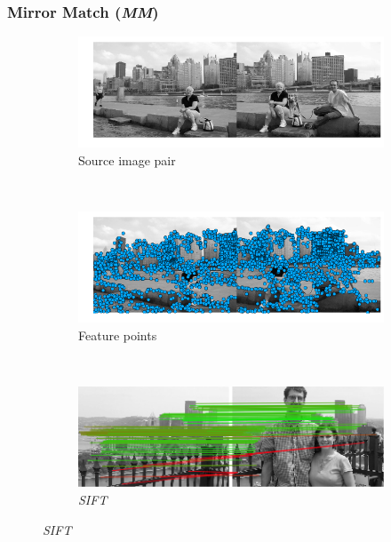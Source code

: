 \documentclass{article}
\begin{document}
\subsubsection{Mirror Match (\emph{MM})}

\begin{figure}
	\centering%
		\begin{subfigure}[t]{\columnwidth}
			\centering
			\includegraphics[width=0.85\columnwidth]{images/MMC_pitts_source}
			\caption{Source image pair}
			\label{fig:pitts_source}
		\end{subfigure}%
		\\ %
		\begin{subfigure}[t]{\columnwidth}
			\centering
			\includegraphics[width=0.85\columnwidth]{images/MMC_pitts_keypoints}
			\caption{Feature points}
			\label{fig:pitts_keypoints}
		\end{subfigure}%
		\\ %
		\begin{subfigure}[t]{\columnwidth}
			\centering
			\includegraphics[width=0.85\columnwidth]{images/mirror_match_off}
			\caption{\emph{SIFT}}
			\label{fig:unique}
		\end{subfigure}%

\end{figure}
\end{document}
